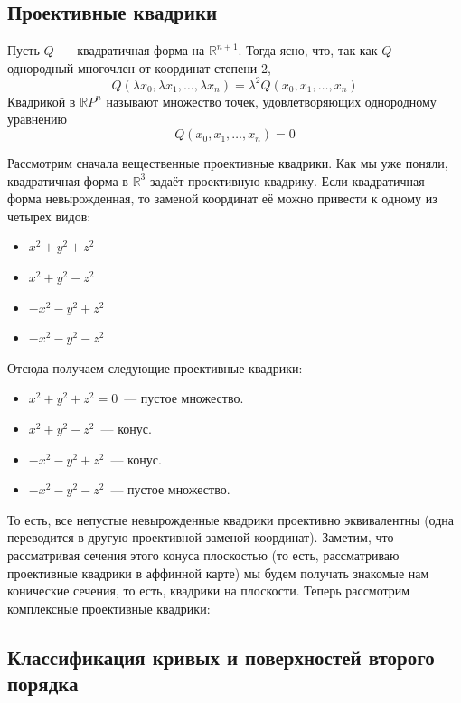 \documentclass[11pt]{article}
\begin{document}
    \subsection{Проективные квадрики}
    \begin{definition}
        Пусть $Q$~--- квадратичная форма на $\mathbb{R}^{n + 1}$. Тогда ясно, что, так как $Q$~--- однородный многочлен от координат степени 2,
        \[ Q(\lambda x_0, \lambda x_1, \ldots, \lambda x_n) = \lambda^2 Q(x_0, x_1, \ldots, x_n) \]
        Квадрикой в $\mathbb{R}P^n$ называют множество точек, удовлетворяющих однородному уравнению
        \[Q(x_0, x_1, \ldots, x_n) = 0 \]
    \end{definition}
    Рассмотрим сначала вещественные проективные квадрики. Как мы уже поняли, квадратичная форма в  $\mathbb{R}^3$ задаёт
    проективную квадрику.
    Если квадратичная форма невырожденная, то заменой координат её можно привести к одному из четырех видов:
    \begin{itemize}
        \item $x^2 + y^2 + z^2$

        \item $x^2 + y^2 - z^2$

        \item $-x^2 - y^2 + z^2$

        \item $-x^2 - y^2 - z^2$
    \end{itemize}
    Отсюда получаем следующие проективные квадрики:
    \begin{itemize}
        \item $x^2 + y^2 + z^2 = 0$~--- пустое множество.

        \item $x^2 + y^2 - z^2$~--- конус.

        \item $-x^2 - y^2 + z^2$~--- конус.

        \item $-x^2 - y^2 - z^2$~--- пустое множество.
    \end{itemize}
    То есть, все непустые невырожденные квадрики проективно эквивалентны (одна переводится в другую проективной заменой координат).
    Заметим, что рассматривая сечения этого конуса плоскостью (то есть, рассматриваю проективные квадрики в аффинной карте) мы будем получать
    знакомые нам конические сечения, то есть, квадрики на плоскости.
    Теперь рассмотрим комплексные проективные квадрики:

    \subsection{Классификация кривых и поверхностей второго порядка}
\end{document}
